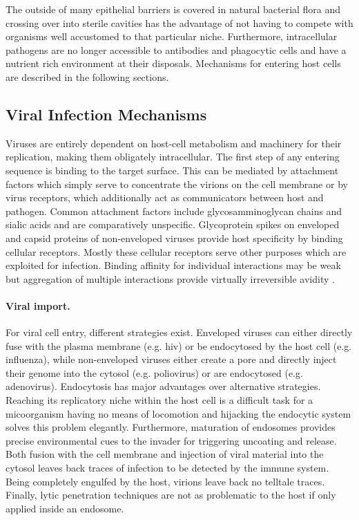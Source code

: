 The outside of many epithelial barriers is covered in natural bacterial flora and crossing over into sterile cavities has the advantage of not having to compete with organisms well accustomed to that particular niche. Furthermore, intracellular pathogens are no longer accessible to antibodies and phagocytic cells and have a nutrient rich environment at their disposals. Mechanisms for entering host cells are described in the following sections.

\subsection{Viral Infection Mechanisms}

Viruses are entirely dependent on host-cell metabolism and machinery for their replication, making them obligately intracellular. The first step of any entering sequence is binding to the target surface. This can be mediated by attachment factors which simply serve to concentrate the virions on the cell membrane or by virus receptors, which additionally act as communicators between host and pathogen. Common attachment factors include glycosamminoglycan chains and sialic acids and are comparatively unspecific. Glycoprotein spikes on enveloped and capsid proteins of non-enveloped viruses provide host specificity by binding cellular receptors. Mostly these cellular receptors serve other purposes which are exploited for infection. Binding affinity for individual interactions may be weak but aggregation of multiple interactions provide virtually irreversible avidity \citep{Smith2012}.

\paragraph{Viral import.}
For viral cell entry, different strategies exist. Enveloped viruses can either directly fuse with the plasma membrane (e.g. \gls{hiv}) or be endocytosed by the host cell (e.g. influenza), while non-enveloped viruses either create a pore and directly inject their genome into the cytosol (e.g. poliovirus) or are endocytosed (e.g. adenovirus). Endocytosis has major advantages over alternative strategies. Reaching its replicatory niche within the host cell is a difficult task for a micoorganism having no means of locomotion and hijacking the endocytic system solves this problem elegantly. Furthermore, maturation of endosomes provides precise environmental cues to the invader for triggering uncoating and release. Both fusion with the cell membrane and injection of viral material into the cytosol leaves back traces of infection to be detected by the immune system. Being completely engulfed by the host, virions leave back no telltale traces. Finally, lytic penetration techniques are not as problematic to the host if only applied inside an endosome.

